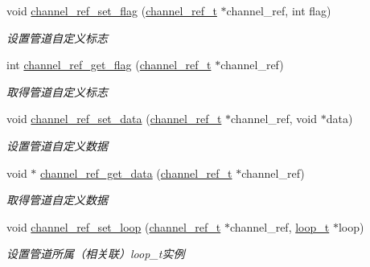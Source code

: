 \begin{DoxyCompactItemize}
void \hyperlink{a00045_a754666526c935285bd6c9367513b5832_a754666526c935285bd6c9367513b5832}{channel\+\_\+ref\+\_\+set\+\_\+flag} (\hyperlink{a00047_a151271c9d188ef28d4d24bb81dcc1263_a151271c9d188ef28d4d24bb81dcc1263}{channel\+\_\+ref\+\_\+t} $\ast$channel\+\_\+ref, int flag)
\begin{DoxyCompactList}\small\item\em 设置管道自定义标志 \end{DoxyCompactList}\item 
int \hyperlink{a00045_a684027d23ecd45142ee91678972b48da_a684027d23ecd45142ee91678972b48da}{channel\+\_\+ref\+\_\+get\+\_\+flag} (\hyperlink{a00047_a151271c9d188ef28d4d24bb81dcc1263_a151271c9d188ef28d4d24bb81dcc1263}{channel\+\_\+ref\+\_\+t} $\ast$channel\+\_\+ref)
\begin{DoxyCompactList}\small\item\em 取得管道自定义标志 \end{DoxyCompactList}\item 
void \hyperlink{a00045_aa639e4f322194aa76b0d01368f086bc0_aa639e4f322194aa76b0d01368f086bc0}{channel\+\_\+ref\+\_\+set\+\_\+data} (\hyperlink{a00047_a151271c9d188ef28d4d24bb81dcc1263_a151271c9d188ef28d4d24bb81dcc1263}{channel\+\_\+ref\+\_\+t} $\ast$channel\+\_\+ref, void $\ast$data)
\begin{DoxyCompactList}\small\item\em 设置管道自定义数据 \end{DoxyCompactList}\item 
void $\ast$ \hyperlink{a00045_ae6545b9c070a0bab99ccfefdf0b4a999_ae6545b9c070a0bab99ccfefdf0b4a999}{channel\+\_\+ref\+\_\+get\+\_\+data} (\hyperlink{a00047_a151271c9d188ef28d4d24bb81dcc1263_a151271c9d188ef28d4d24bb81dcc1263}{channel\+\_\+ref\+\_\+t} $\ast$channel\+\_\+ref)
\begin{DoxyCompactList}\small\item\em 取得管道自定义数据 \end{DoxyCompactList}\item 
void \hyperlink{a00045_ad7b9246a8768f761ffdd1756ea389181_ad7b9246a8768f761ffdd1756ea389181}{channel\+\_\+ref\+\_\+set\+\_\+loop} (\hyperlink{a00047_a151271c9d188ef28d4d24bb81dcc1263_a151271c9d188ef28d4d24bb81dcc1263}{channel\+\_\+ref\+\_\+t} $\ast$channel\+\_\+ref, \hyperlink{a00047_a9c3ad1cd2de83e09f3a7b59fa82c94ee_a9c3ad1cd2de83e09f3a7b59fa82c94ee}{loop\+\_\+t} $\ast$loop)
\begin{DoxyCompactList}\small\item\em 设置管道所属（相关联）loop\+\_\+t实例 \end{DoxyCompactList}\item 

\end{DoxyCompactItemize}
